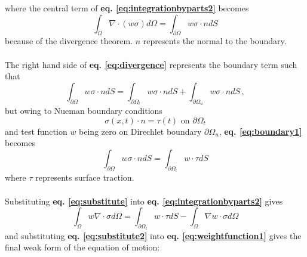where the central term of {\bfseries eq. \ref{eq:integrationbyparts2}} becomes
\begin{equation}
\int_\Omega\nabla\cdot (w\sigma) d\Omega= \int_{\partial\Omega} w \sigma \cdot n dS
\label{eq:divergence}
\end{equation}
because of the divergence theorem. $n$ represents the normal to the boundary.\\\\The right hand side of {\bfseries eq. \ref{eq:divergence}} represents the boundary term such that
\begin{equation}
\int_{\partial\Omega} w \sigma \cdot n dS = \int_{\partial\Omega_t} w\sigma\cdot n dS + \int_{\partial\Omega_u} w\sigma\cdot n dS \,,
\label{eq:boundary1}
\end{equation}
but owing to Nueman boundary conditions
\begin{equation}
\sigma(x,t)\cdot n = \tau(t) \text{ on } \partial\Omega_t
\label{eq:neumen}
\end{equation}
and test function $w$ being zero on Direchlet boundary $\partial\Omega_u$, {\bfseries eq. \ref{eq:boundary1}} becomes
\begin{equation}
\int_{\partial\Omega} w \sigma \cdot n dS = \int_{\partial\Omega_t} w\cdot\tau  dS
\label{eq:substitute}
\end{equation}
where $\tau$ represents surface traction.\\\\
Substituting {\bfseries eq. \ref{eq:substitute}} into {\bfseries eq. \ref{eq:integrationbyparts2}} gives
\begin{equation}
\int_\Omega w\nabla\cdot\sigma d\Omega= \int_{\partial\Omega_t} w\cdot\tau dS - \int_\Omega \nabla w\cdot\sigma d\Omega
\label{eq:substitute2}
\end{equation}
and substituting  {\bfseries eq. \ref{eq:substitute2}} into {\bfseries eq. \ref{eq:weightfunction1}} gives the final weak form of the equation of motion:

